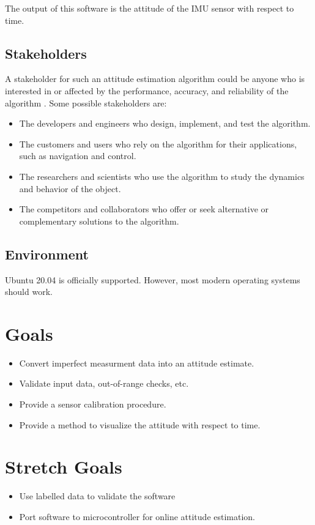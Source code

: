 \documentclass{article}
\begin{document}
The output of this software is the attitude of the IMU sensor with respect to time.


\subsection{Stakeholders}

A stakeholder for such an attitude estimation algorithm could be anyone who is interested in or affected by the performance, accuracy, and reliability of the algorithm \cite{stake}. Some possible stakeholders are:

\begin{itemize}
    \item The developers and engineers who design, implement, and test the algorithm.
    \item The customers and users who rely on the algorithm for their applications, such as navigation and control.
    \item The researchers and scientists who use the algorithm to study the dynamics and behavior of the object.
    \item The competitors and collaborators who offer or seek alternative or complementary solutions to the algorithm.
\end{itemize}
    

\subsection{Environment}

Ubuntu 20.04 is officially supported. However, most modern operating systems should work.

\section{Goals}

\begin{itemize}
    \item Convert imperfect measurment data into an attitude estimate.
    \item Validate input data, out-of-range checks, etc.
    \item Provide a sensor calibration procedure.
    \item Provide a method to visualize the attitude with respect to time.
\end{itemize}

\section{Stretch Goals}

\begin{itemize}
    \item Use labelled data to validate the software
    \item Port software to microcontroller for online attitude estimation.
\end{itemize}

{}

\end{document}
